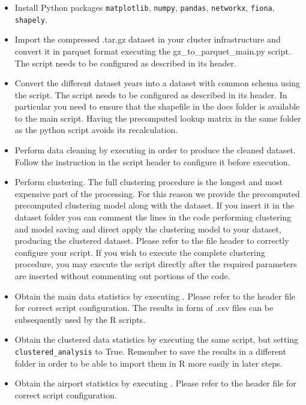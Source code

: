 \documentclass{acm_proc_article-sp-sigmod09}
\begin{document}
\begin{itemize}
	\item Install Python packages \texttt{matplotlib}, \texttt{numpy}, \texttt{pandas}, \texttt{networkx}, \texttt{fiona}, \texttt{shapely}.
	\item Import the compressed .tar.gz dataset in your cluster infrastructure and convert it in parquet format executing the gz\_to\_parquet\_main.py script. The script needs to be configured as described in its header.
	\item Convert the different dataset years into a dataset with common schema using the  script. The script needs to be configured as described in its header. In particular you need to ensure that the shapefile in the docs folder is available to the main script. Having the  precomputed lookup matrix in the same folder as the python script avoids its recalculation.
	\item Perform data cleaning by executing  in order to produce the cleaned dataset. Follow the instruction in the script header to configure it before execution.
	\item Perform clustering. The full clustering procedure is the longest and most expensive part of the processing. For this reason we provide the precomputed  precomputed clustering model along with the dataset. If you insert it in the dataset folder you can comment the lines in the code performing clustering and model saving and direct apply the clustering model to your dataset, producing the clustered dataset. Please refer to the file header to correctly configure your script. If you wish to execute the complete clustering procedure, you may execute the script directly after the required parameters are inserted without commenting out portions of the code.
	\item Obtain the main data statistics by executing . Please refer to the header file for correct script configuration. The results in form of .csv files can be subsequently used by the R scripts.
	\item Obtain the clustered data statistics by executing the same script, but setting \texttt{clustered\_analysis} to True. Remember to save the results in a different folder in order to be able to import them in R more easily in later steps.
	\item Obtain the airport statistics by executing . Please refer to the header file for correct script configuration.

\end{itemize}
\end{document}
